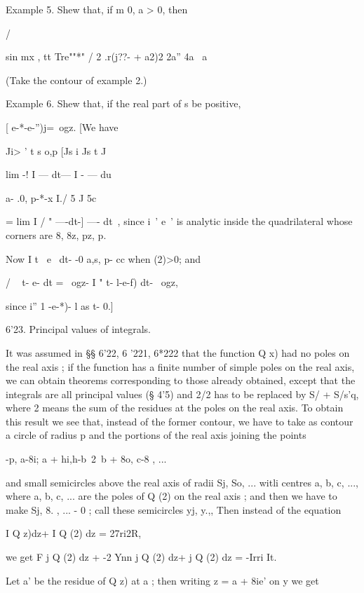 Example 5. Shew that, if m 0, a > 0, then



/



sin mx , tt Tre""*" / 2 .r(j??- + a2)2 2a'' 4a \ a



(Take the contour of example 2.)

Example 6. Shew that, if the real part of s be positive,

[ e-*-e-'')j=\ ogz. [We have

Ji> ' t s o,p [Js i Js t J

lim -! I — dt— I - — du



a- .0, p-*-x I./ 5 J 5c

= lim I / " —-dt-] —- dt\ , since i~' e~' is analytic inside the
quadrilateral whose corners are 8, 8z, pz, p.


%
%

Now I t~ e~ dt- -0 a,s, p- cc when (2)>0; and

/ ~ t- e- dt = \ ogz- I " t- l-e-f) dt- \ ogz,

since i'' 1 -e-*)- l as t- 0.]

6'23. Principal values of integrals.

It was assumed in §§ 6'22, 6 '221, 6*222 that the function Q x) had no
poles on the real axis ; if the function has a finite number of simple
poles on the real axis, we can obtain theorems corresponding to those
already obtained, except that the integrals are all principal values
(§ 4'5) and 2/2 has to be replaced by S/ + S/s'q, where 2 means the
sum of the residues at the poles on the real axis. To obtain this
result we see that, instead of the former contour, we have to take as
contour a circle of radius p and the portions of the real axis joining
the points

-p, a-8i; a + hi,h-b~2\ b + 8o, c-8 , ...

and small semicircles above the real axis of radii Sj, So, ... witli
centres a, b, c, ..., where a, b, c, ... are the poles of Q (2) on the
real axis ; and then we have to make Sj, 8. , ... - 0 ; call these
semicircles yj, y.,, Then instead of the equation

I Q z)dz+ I Q (2) dz = 27ri2R,

we get F j Q (2) dz + -2 Ynn j Q (2) dz+ j Q (2) dz = -Irri It.

Let a' be the residue of Q z) at a ; then writing z = a + 8ie' on y we
get

